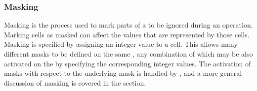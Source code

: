 \documentclass[letterpaper,10pt,english]{sphinxmanual}
\begin{document}
\begin{sphinxVerbatim}[commandchars=\\\{\}]
  \PYG{p}{[}\PYG{p}{]} 
                      
\end{sphinxVerbatim}


\subsubsection{Masking}
\label{\detokenize{api:masking}}
Masking is the process used to mark parts of a {\hyperref[\detokenize{grid:ESMF.api.grid.Grid}]{}} to be ignored during an
operation. Marking {\hyperref[\detokenize{grid:ESMF.api.grid.Grid}]{}} cells as masked can affect the {\hyperref[\detokenize{field:ESMF.api.field.Field}]{}} values that are
represented by those cells. Masking is specified by assigning an integer value
to a {\hyperref[\detokenize{grid:ESMF.api.grid.Grid}]{}} cell. This allows many different masks to be defined on the same {\hyperref[\detokenize{grid:ESMF.api.grid.Grid}]{}},
any combination of which may be also activated on the {\hyperref[\detokenize{field:ESMF.api.field.Field}]{}} by specifying the
corresponding integer values. The activation of {\hyperref[\detokenize{field:ESMF.api.field.Field}]{}} masks with respect to the
underlying {\hyperref[\detokenize{grid:ESMF.api.grid.Grid}]{}} mask is handled by {\hyperref[\detokenize{regrid:ESMF.api.regrid.Regrid}]{}}, and a more
general discussion of masking is covered in the {\hyperref[\detokenize{api:id9}]{}}
section.
\end{document}
